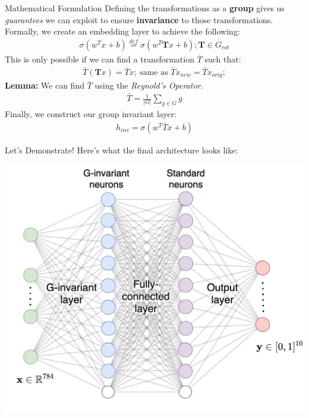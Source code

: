 \documentclass{beamer}
\begin{document}
\begin{frame}{Mathematical Formulation}
	Defining the transformations as a \textbf{group} gives us \textit{guarantees} we can exploit to ensure \textbf{invariance} to those transformations. \pause \newline \\

	Formally, we create an embedding layer to achieve the following:
	\begin{gather}
		\sigma(w^Tx + b) \stackrel{def}{=} \sigma(w^T \bm{T} x + b); \bm{T} \in G_{rot}
	\end{gather} \pause
	This is only possible if we can find a transformation $\bar{T}$ such that:
	\begin{gather}
		\bar{T}(\bm{T} x) = \bar{T} x;~\text{same as }
		\bar{T}x_{new} = \bar{T} x_{orig}; 
	\end{gather} \pause
	\textbf{Lemma:} We can find $\bar{T}$ using the \textit{Reynold's Operator}.
	\begin{gather}
		\bar{T} = \frac{1}{|G|}\sum_{g \in G}g
	\end{gather} \pause
	Finally, we construct our group invariant layer:
	\begin{gather}
		h_{inv} = \sigma(w^T\bar{T}x + b)
	\end{gather}
\end{frame}

\begin{frame}{Let's Demonstrate!}
	Here's what the final architecture looks like:
	\begin{center}
		\includegraphics[width=.7\textwidth]{img/mlp.png}
	\end{center}
\end{frame}
\end{document}
